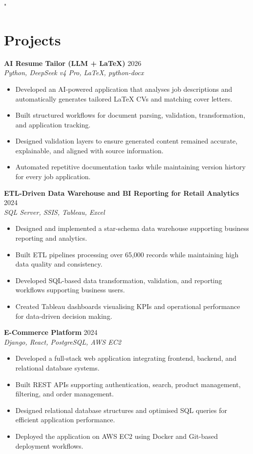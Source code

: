 "\documentclass[10pt,a4paper]{article}
\begin{document}
\section{Projects}
\textbf{AI Resume Tailor (LLM + LaTeX)} \hfill 2026 \\
\textit{Python, DeepSeek v4 Pro, LaTeX, python-docx}
\begin{itemize}
\item Developed an AI-powered application that analyses job descriptions and automatically generates tailored LaTeX CVs and matching cover letters.
\item Built structured workflows for document parsing, validation, transformation, and application tracking.
\item Designed validation layers to ensure generated content remained accurate, explainable, and aligned with source information.
\item Automated repetitive documentation tasks while maintaining version history for every job application.
\end{itemize}
\textbf{ETL-Driven Data Warehouse and BI Reporting for Retail Analytics} \hfill 2024 \\
\textit{SQL Server, SSIS, Tableau, Excel}
\begin{itemize}
\item Designed and implemented a star-schema data warehouse supporting business reporting and analytics.
\item Built ETL pipelines processing over 65,000 records while maintaining high data quality and consistency.
\item Developed SQL-based data transformation, validation, and reporting workflows supporting business users.
\item Created Tableau dashboards visualising KPIs and operational performance for data-driven decision making.
\end{itemize}
\textbf{E-Commerce Platform} \hfill 2024 \\
\textit{Django, React, PostgreSQL, AWS EC2}
\begin{itemize}
\item Developed a full-stack web application integrating frontend, backend, and relational database systems.
\item Built REST APIs supporting authentication, search, product management, filtering, and order management.
\item Designed relational database structures and optimised SQL queries for efficient application performance.
\item Deployed the application on AWS EC2 using Docker and Git-based deployment workflows.
\end{itemize}
\end{document}
